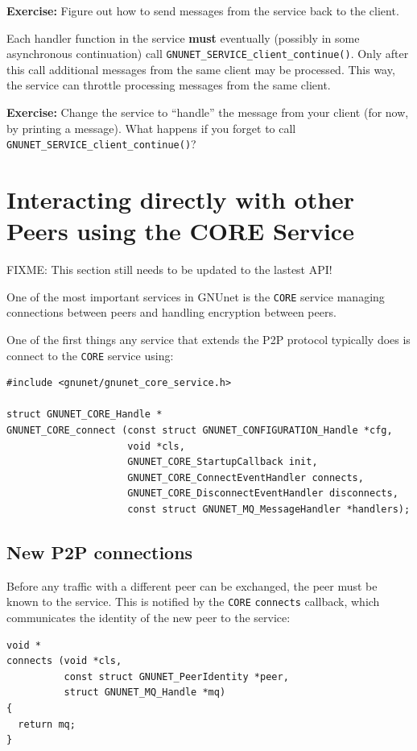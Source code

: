 \documentclass[10pt]{article}
\newcommand{\exercise}[1]{\noindent\begin{boxedminipage}{\textwidth}{\bf Exercise:} #1 \end{boxedminipage}}
\begin{document}
\exercise{Figure out how to send messages from the service back to the
  client.}

Each handler function in the service {\bf must} eventually (possibly in some
asynchronous continuation) call {\tt GNUNET\_SERVICE\_client\_continue()}.
Only after this call additional messages from the same client may
be processed. This way, the service can throttle processing messages
from the same client.

\exercise{Change the service to ``handle'' the message from your
  client (for now, by printing a message).  What happens if you
  forget to call {\tt GNUNET\_SERVICE\_client\_continue()}?}


\section{Interacting directly with other Peers using the CORE Service}

FIXME: This section still needs to be updated to the lastest API!

One of the most important services in GNUnet is the \texttt{CORE} service
managing connections between peers and handling encryption between peers.

One of the first things any service that extends the P2P protocol typically does
is connect to the \texttt{CORE} service using:

\lstset{language=C}
\begin{lstlisting}
#include <gnunet/gnunet_core_service.h>

struct GNUNET_CORE_Handle *
GNUNET_CORE_connect (const struct GNUNET_CONFIGURATION_Handle *cfg,
                     void *cls,
                     GNUNET_CORE_StartupCallback init,
                     GNUNET_CORE_ConnectEventHandler connects,
                     GNUNET_CORE_DisconnectEventHandler disconnects,
                     const struct GNUNET_MQ_MessageHandler *handlers);
\end{lstlisting}

\subsection{New P2P connections}

Before any traffic with a different peer can be exchanged, the peer must be
known to the service. This is notified by the \texttt{CORE} {\tt connects} callback,
which communicates the identity of the new peer to the service:

\lstset{language=C}
\begin{lstlisting}
void *
connects (void *cls,
          const struct GNUNET_PeerIdentity *peer,
          struct GNUNET_MQ_Handle *mq)
{
  return mq;
}
\end{lstlisting}
\end{document}
